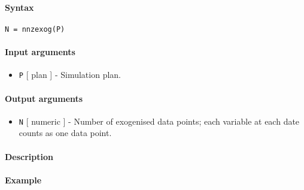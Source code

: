 


	\paragraph{Syntax}

\begin{verbatim}
N = nnzexog(P)
\end{verbatim}

\paragraph{Input arguments}

\begin{itemize}
\itemsep1pt\parskip0pt
\item
  \texttt{P} {[} plan {]} - Simulation plan.
\end{itemize}

\paragraph{Output arguments}

\begin{itemize}
\itemsep1pt\parskip0pt
\item
  \texttt{N} {[} numeric {]} - Number of exogenised data points; each
  variable at each date counts as one data point.
\end{itemize}

\paragraph{Description}

\paragraph{Example}



